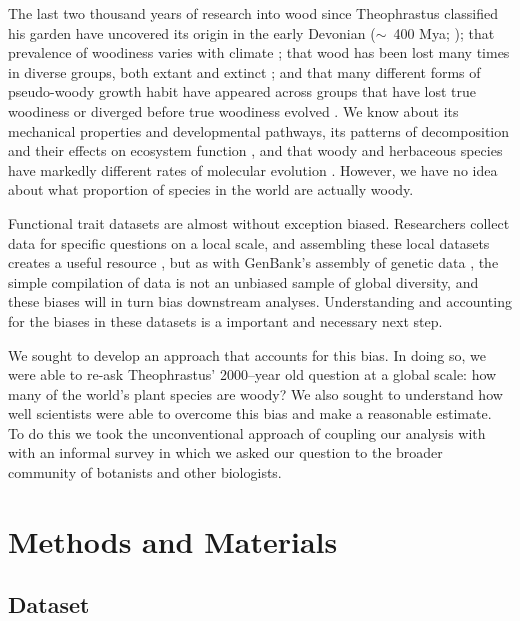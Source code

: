 \documentclass[a4paper,12pt]{article}
\begin{document}
The last two thousand years of research into wood since Theophrastus
classified his garden have uncovered its origin in the early Devonian
($\sim$~400 Mya; \citealt{gerrienne2011simple}); that prevalence of
woodiness varies with climate \citep{Molesheihgt}; that wood has been
lost many times in diverse groups, both extant and extinct
\citep{judd1994}; and that many different forms of pseudo-woody growth
habit have appeared across groups that have lost true woodiness or
diverged before true woodiness evolved \citep{Cornwellwood}.  We know
about its mechanical properties and developmental pathways, its
patterns of decomposition and their effects on ecosystem function
\citep{Cornwellwood}, and that woody and herbaceous species have
markedly different rates of molecular evolution \citep{SmithDonoghue}.
%
However, we have no idea about what proportion of species in the world
are actually woody.

Functional trait datasets are almost without exception biased.  
Researchers collect data for specific questions on a local scale, and
assembling these local datasets creates a useful resource \citep{kattge2011try}, 
but as with GenBank's assembly of genetic data \citep{smith2011understanding},
the simple compilation of data is not an unbiased sample of global diversity, and 
these biases will in turn bias downstream analyses.
Understanding and accounting for the biases in these datasets is a 
important and necessary next step.

We sought to develop an approach that accounts for this bias.  In doing so, we 
were able to re-ask Theophrastus' 2000--year old
question at a global scale: how many of the world's plant species are
woody?
%
We also sought to understand how well scientists were able to overcome this bias and make a reasonable estimate.  To do this 
we took the unconventional approach of coupling our
analysis with with an informal survey in which we asked our question
to the broader community of botanists and other biologists.
% 
%

\section{Methods and Materials}

\subsection{Dataset}
\end{document}
